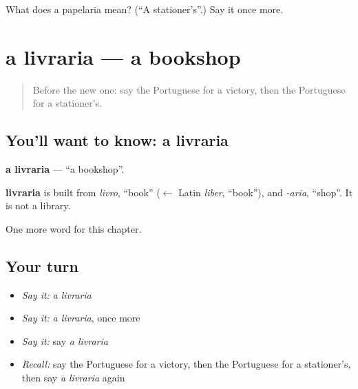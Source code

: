 \begin{tcolorbox}[breakable,colback=teal!4,colframe=teal!35!black,title={Before you move on}]
What does a papelaria mean? (\textquotedblleft{}A stationer's\textquotedblright{}.) Say it once more.
\end{tcolorbox}
\section[a livraria]{a livraria — a bookshop}

\label{lesson:PT-C227-livraria}



\begin{quote}
Before the new one: say the Portuguese for a victory, then the Portuguese for a stationer's.
\end{quote}

\subsection*{You'll want to know: a livraria}
\textbf{a livraria} — \textquotedblleft{}a bookshop\textquotedblright{}.

\begin{cousinweb}
\textbf{livraria} is built from \emph{livro}, \textquotedblleft{}book\textquotedblright{} ($\leftarrow$ Latin \emph{liber}, \textquotedblleft{}book\textquotedblright{}), and \emph{-aria}, \textquotedblleft{}shop\textquotedblright{}. It is not a library.
\end{cousinweb}

\begin{grammarlens}[title={What you've built}]
One more word for this chapter.
\end{grammarlens}

\subsection*{Your turn}
\begin{itemize}
\raggedright
  \item \emph{Say it:} \emph{a livraria}
  \item \emph{Say it:} \emph{a livraria}, once more
  \item \emph{Say it:} say \emph{a livraria}
  \item \emph{Recall:} say the Portuguese for a victory, then the Portuguese for a stationer's, then say \emph{a livraria} again
\end{itemize}

